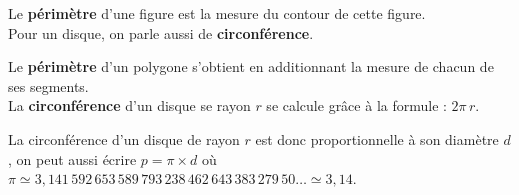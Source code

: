 {\begin{definition}
   Le \textbf{périmètre} d'une figure est la mesure du contour de cette figure. \\
   Pour un disque, on parle aussi de {\bf circonférence}.
\end{definition}

\begin{propriete}
   Le {\bf périmètre} d'un polygone s'obtient en additionnant la mesure de chacun de ses segments. \\
   La {\bf circonférence} d'un disque se rayon $r$ se calcule grâce à la formule : $2\pi\,r$.
\end{propriete}

\medskip
La circonférence d'un disque de rayon $r$ est donc proportionnelle à son diamètre $d$, on peut aussi écrire $p =\pi\times d$ où $\pi \simeq 3,141\,592\,653\,589\,793\,238\,462\,643\,383\,279\,50\dots{} \simeq 3,14$. \medskip

}
